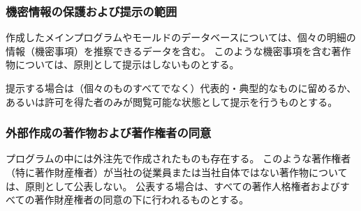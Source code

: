 \subsubsection{機密情報の保護および提示の範囲\label{subsec:notopenwork}}
作成したメインプログラムやモールドのデータベースについては、個々の明細の情報（機密事項）を推察できるデータを含む。
このような機密事項を含む著作物については、原則として提示はしないものとする。

提示する場合は（個々のものすべてでなく）代表的・典型的なものに留めるか、あるいは許可を得た者のみが閲覧可能な状態として提示を行うものとする。

\subsubsection{外部作成の著作物および著作権者の同意\label{subsec:standardscopyrightsSubcontractor}}
プログラムの中には外注先で作成されたものも存在する。
このような著作権者（特に著作財産権者）が当社の従業員または当社自体ではない著作物については、原則として公表しない。
公表する場合は、すべての著作人格権者およびすべての著作財産権者の同意の下に行われるものとする。




